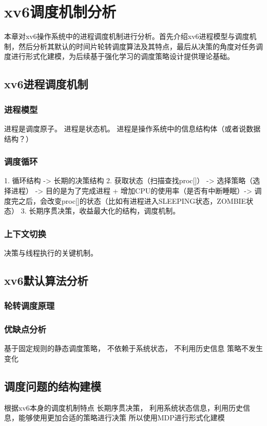 \section{xv6调度机制分析}
本章对xv6操作系统中的进程调度机制进行分析。首先介绍xv6进程模型与调度机制，然后分析其默认的时间片轮转调度算法及其特点，最后从决策的角度对任务调度进行形式化建模，为后续基于强化学习的调度策略设计提供理论基础。
\subsection{xv6进程调度机制}
\subsubsection{进程模型}
进程是调度原子。
进程是状态机。
进程是操作系统中的信息结构体（或者说数据结构？）
\subsubsection{调度循环}
1. 循环结构 -> 长期的决策结构
2. 获取状态（扫描查找proc[]） -> 选择策略（选择进程） ->  目的是为了完成进程 + 增加CPU的使用率（是否有中断睡眠）-> 调度完之后，会改变proc[]的状态（比如有进程进入SLEEPING状态，ZOMBIE状态）
3. 长期序贯决策，收益最大化的结构，调度机制。
\subsubsection{上下文切换}
决策与线程执行的关键机制。
\subsection{xv6默认算法分析}
\subsubsection{轮转调度原理}
\subsubsection{优缺点分析}
基于固定规则的静态调度策略，
不依赖于系统状态，
不利用历史信息
策略不发生变化
\subsection{调度问题的结构建模}
根据xv6本身的调度机制特点
长期序贯决策，
利用系统状态信息，利用历史信息，能够使用更加合适的策略进行决策
所以使用MDP进行形式化建模